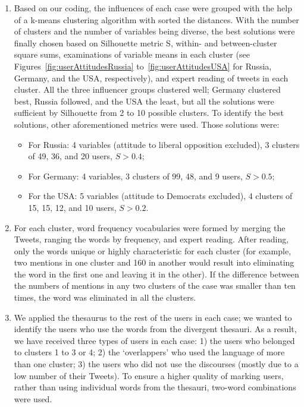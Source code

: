 \begin{enumerate}
	\item Based on our coding, the influences of each case were grouped with the help of a k-means clustering algorithm with sorted the distances. With the number of clusters and the number of variables being diverse, the best solutions were finally chosen based on Silhouette metric S, within- and between-cluster square sums, examinations of variable means in each cluster (see Figures~\cref{fig:userAttitudesRussia} to~\cref{fig:userAttitudesUSA} for Russia, Germany, and the USA, respectively), and expert reading of tweets in each cluster. All the three influencer groups clustered well; Germany clustered best, Russia followed, and the USA the least, but all the solutions were sufficient by Silhouette from 2 to 10 possible clusters. To identify the best solutions, other aforementioned metrics were used. Those solutions were:
	\begin{itemize}
		\item For Russia: 4 variables (attitude to liberal opposition excluded), 3 clusters of 49, 36, and 20 users, \(S > 0.4\); 
		
		\item For Germany: 4 variables, 3 clusters of 99, 48, and 9 users, \(S > 0.5\);
		
		\item For the USA: 5 variables (attitude to Democrats excluded), 4 clusters of 15, 15, 12, and 10 users, \(S > 0.2\).
	\end{itemize}
	\item For each cluster, word frequency vocabularies were formed by merging the Tweets, ranging the words by frequency, and expert reading. After reading, only the words unique or highly characteristic for each cluster (for example, two mentions in one cluster and 160 in another would result into eliminating the word in the first one and leaving it in the other). If the difference between the numbers of mentions in any two clusters of the case was smaller than ten times, the word was eliminated in all the clusters.
	
	\item We applied the thesaurus to the rest of the users in each case; we wanted to identify the users who use the words from the divergent thesauri. As a result, we have received three types of users in each case: 1) the users who belonged to clusters 1 to 3 or 4; 2) the ‘overlappers’ who used the language of more than one cluster; 3) the users who did not use the discourses (mostly due to a low number of their Tweets). To ensure a higher quality of marking users, rather than using individual words from the thesauri, two-word combinations were used.
	

\end{enumerate}
